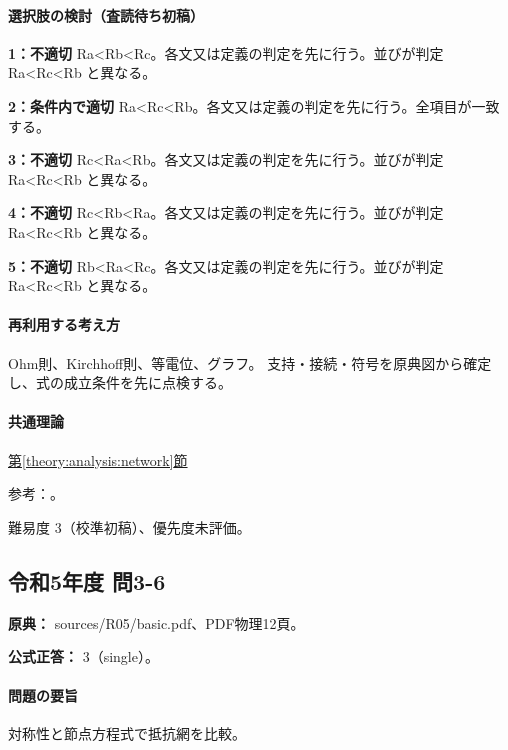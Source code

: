 \paragraph{選択肢の検討（査読待ち初稿）}\mbox{}\par

\noindent\textbf{1：不適切} Ra<Rb<Rc。各文又は定義の判定を先に行う。並びが判定 Ra<Rc<Rb と異なる。\par

\noindent\textbf{2：条件内で適切} Ra<Rc<Rb。各文又は定義の判定を先に行う。全項目が一致する。\par

\noindent\textbf{3：不適切} Rc<Ra<Rb。各文又は定義の判定を先に行う。並びが判定 Ra<Rc<Rb と異なる。\par

\noindent\textbf{4：不適切} Rc<Rb<Ra。各文又は定義の判定を先に行う。並びが判定 Ra<Rc<Rb と異なる。\par

\noindent\textbf{5：不適切} Rb<Ra<Rc。各文又は定義の判定を先に行う。並びが判定 Ra<Rc<Rb と異なる。\par

\paragraph{再利用する考え方} Ohm則、Kirchhoff則、等電位、グラフ。 支持・接続・符号を原典図から確定し、式の成立条件を先に点検する。

\paragraph{共通理論} \hyperref[theory:analysis:network]{第\ref*{theory:analysis:network}節}

\par 参考：\cite{analysis57_resistors}。

\par 難易度 3（校準初稿）、優先度未評価。

\subsection{令和5年度 問3-6}
\label{q:r05-reg-basic-3-6}

\noindent\textbf{原典：} sources/R05/basic.pdf、PDF物理12頁。

\textbf{公式正答：} 3（single）。

\paragraph{問題の要旨} 対称性と節点方程式で抵抗網を比較。


